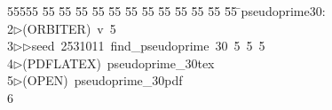 %
%
\begin{tabbing}
55555 \= 55 \= 55 \= 55 \= 55 \= 55 \= 55 \= 55 \= 55 \= 55 \= 55 \= 55 \= 55 \= \>pseudoprime30:\\[0pt]
2\>$\triangleright$\>(ORBITER)\ v\ 5\ \\[0pt]
3\>$\triangleright$\>$\triangleright$\>seed\ 2531011\ find\_pseudoprime\ 30\ 5\ 5\ 5\ \\[0pt]
4\>$\triangleright$\>(PDFLATEX)\ pseudoprime\_30tex\\[0pt]
5\>$\triangleright$\>(OPEN)\ pseudoprime\_30pdf\\[0pt]
6\>\end{tabbing}
